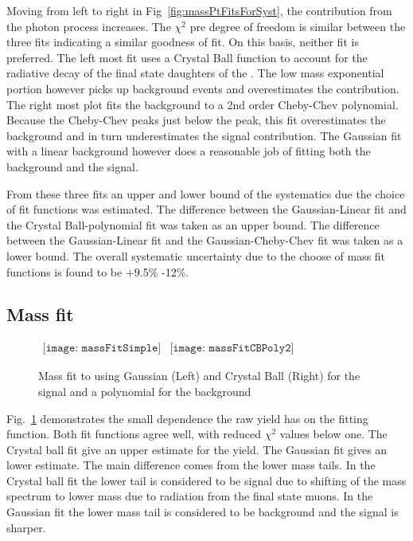       Moving from left to right in Fig~\ref{fig:massPtFitsForSyst}, the 
        contribution from the photon process increases.
      The $\chi^{2}$ pre degree of freedom is similar between the three 
        fits indicating a similar goodness of fit.
      On this basis, neither fit is preferred. 
      The left most fit uses a Crystal Ball function to account for the 
        radiative decay of the final state daughters of the \JPsi{}.
      The low mass exponential portion however picks up background events 
        and overestimates the \JPsi{} contribution. 
      The right most plot fits the background to a 2nd order Cheby-Chev 
        polynomial.
      Because the Cheby-Chev peaks just below the \JPsi{} peak, this fit 
        overestimates the background and in turn underestimates the signal 
        contribution.
      The Gaussian fit with a linear background however does a reasonable job
        of fitting both the background and the signal. 

      From these three fits an upper and lower bound of the systematics due
        the choice of fit functions was estimated. 
      The difference between the Gaussian-Linear fit and the 
        Crystal Ball-polynomial fit was taken as an upper bound. 
      The difference between the Gaussian-Linear fit and the 
          Gaussian-Cheby-Chev fit was taken as a lower bound. 
      The overall systematic uncertainty due to the choose of mass fit 
        functions is found to be +9.5\% -12\%.

    \subsection{Mass fit}

      \begin{figure}[!Hhtb]
        \centering
        $ \begin{array}{cc}
          \texttt{[image: massFitSimple]} &
          \texttt{[image: massFitCBPoly2]}
        \end{array} $
        \caption{Mass fit to \JPsi{} using Gaussian (Left) and Crystal Ball (Right) for the 
          signal and a polynomial for the background}
        \label{fig:massFitSys}
      \end{figure}
      Fig.~\ref{fig:massFitSys} demonstrates the small dependence the raw 
        \JPsi{} yield has on the fitting function. 
      Both fit functions agree well, with reduced $\chi^{2}$ values below one.
      The Crystal ball fit give an upper estimate for the \JPsi{} yield.
      The Gaussian fit gives an lower estimate. 
      The main difference comes from the lower mass tails.
      In the Crystal ball fit the lower tail is considered to be signal due to 
        shifting of the mass spectrum to lower mass due to radiation from the 
        final state muons. 
      In the Gaussian fit the lower mass tail is considered to be background and 
        the signal is sharper.


